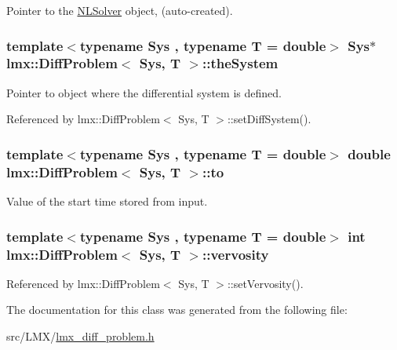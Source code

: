 Pointer to the \hyperlink{classlmx_1_1NLSolver}{N\-L\-Solver} object, (auto-\/created). 

\hypertarget{classlmx_1_1DiffProblem_a9f5d3e07c69d65267b57c42b412705f6}{
\subsubsection[{the\-System}]{\setlength{\rightskip}{0pt plus 5cm}template$<$typename Sys , typename T  = double$>$ Sys$\ast$ {\bf lmx\-::\-Diff\-Problem}$<$ Sys, T $>$\-::the\-System\hspace{0.3cm}{\ttfamily [protected]}}}\label{classlmx_1_1DiffProblem_a9f5d3e07c69d65267b57c42b412705f6}


Pointer to object where the differential system is defined. 



Referenced by lmx\-::\-Diff\-Problem$<$ Sys, T $>$\-::set\-Diff\-System().

\hypertarget{classlmx_1_1DiffProblem_a760ffa595e70cae2531f3216aac6c46e}{
\subsubsection[{to}]{\setlength{\rightskip}{0pt plus 5cm}template$<$typename Sys , typename T  = double$>$ double {\bf lmx\-::\-Diff\-Problem}$<$ Sys, T $>$\-::to\hspace{0.3cm}{\ttfamily [protected]}}}\label{classlmx_1_1DiffProblem_a760ffa595e70cae2531f3216aac6c46e}


Value of the start time stored from input. 

\hypertarget{classlmx_1_1DiffProblem_a9c30436b4fe89c4da9ceb9194191a6b0}{
\subsubsection[{vervosity}]{\setlength{\rightskip}{0pt plus 5cm}template$<$typename Sys , typename T  = double$>$ int {\bf lmx\-::\-Diff\-Problem}$<$ Sys, T $>$\-::vervosity\hspace{0.3cm}{\ttfamily [protected]}}}\label{classlmx_1_1DiffProblem_a9c30436b4fe89c4da9ceb9194191a6b0}


Referenced by lmx\-::\-Diff\-Problem$<$ Sys, T $>$\-::set\-Vervosity().



The documentation for this class was generated from the following file\-:\begin{DoxyCompactItemize}
\item 
src/\-L\-M\-X/\hyperlink{lmx__diff__problem_8h}{lmx\-\_\-diff\-\_\-problem.\-h}\end{DoxyCompactItemize}
